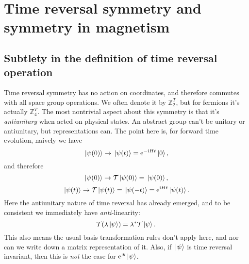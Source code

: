 \documentclass[hyperref, a4paper]{article}
\newcommand*{\ii}{\mathrm{i}}
\newcommand*{\ee}{\mathrm{e}}
\begin{document}
\section{Time reversal symmetry and symmetry in magnetism}

\subsection{Subtlety in the definition of time reversal operation}

Time reversal symmetry has no action on coordinates, and therefore commutes with all space group operations.
We often denote it by $\mathbb{Z}_2^T$, but for fermions it's actually $\mathbb{Z}_4^T$. The most nontrivial aspect about this symmetry is that it's \emph{antiunitary}
when acted on physical states. An abstract group can't be unitary or antiunitary, but representations can.
The point here is, for forward time evolution, naively we have 
\[
    \ket*{\psi(0)} \to \ket*{\psi(t)} = \ee^{- \ii H t} \ket*{0},
\]
and therefore 
\[
    \ket*{\psi(0)} \to \mathcal{T} \ket*{\psi(0)} = \ket*{\psi(0)},
\]
\[
    \ket*{\psi(t)} \to \mathcal{T} \ket*{\psi(t)} = \ket*{\psi(-t)} = \ee^{\ii H t} \ket*{\psi(t)}.
\]
Here the antiunitary nature of time reversal has already emerged, and to be consistent we immediately have 
\emph{anti}-linearity:
\begin{equation}
    \mathcal{T} (\lambda \ket*{\psi}) = \lambda^* \mathcal{T} \ket*{\psi}.
\end{equation}
This also means the usual basis transformation rules don't apply here, and nor can we write down a matrix 
representation of it. Also, if $\ket*{\psi}$ is time reversal invariant, then this is \emph{not} the case 
for $\ee^{\ii \theta} \ket*{\psi}$. 
\end{document}
